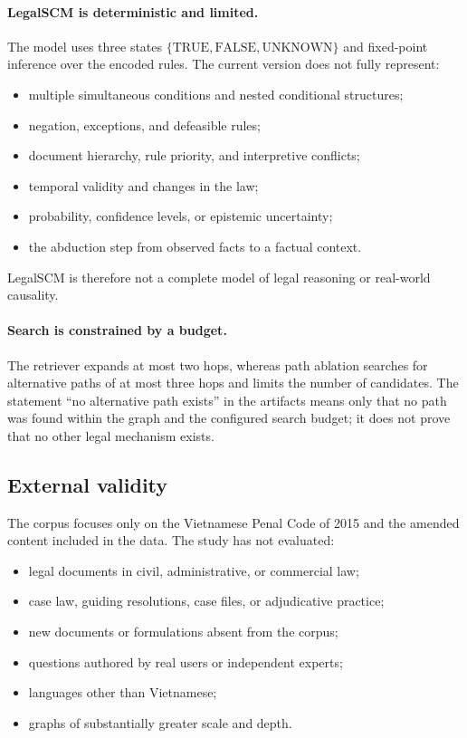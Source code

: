 \paragraph{LegalSCM is deterministic and limited.}

The model uses three states
$\{\mathrm{TRUE},\mathrm{FALSE},\mathrm{UNKNOWN}\}$ and fixed-point
inference over the encoded rules. The current version does not fully
represent:

\begin{itemize}
    \item multiple simultaneous conditions and nested conditional structures;
    \item negation, exceptions, and defeasible rules;
    \item document hierarchy, rule priority, and interpretive conflicts;
    \item temporal validity and changes in the law;
    \item probability, confidence levels, or epistemic uncertainty;
    \item the abduction step from observed facts to a factual context.
\end{itemize}

LegalSCM is therefore not a complete model of legal reasoning or real-world
causality.

\paragraph{Search is constrained by a budget.}

The retriever expands at most two hops, whereas path ablation searches for
alternative paths of at most three hops and limits the number of candidates.
The statement ``no alternative path exists'' in the artifacts means only that
no path was found within the graph and the configured search budget; it does
not prove that no other legal mechanism exists.

\subsection{External validity}

The corpus focuses only on the Vietnamese Penal Code of 2015 and the amended
content included in the data. The study has not evaluated:

\begin{itemize}
    \item legal documents in civil, administrative, or commercial law;
    \item case law, guiding resolutions, case files, or adjudicative practice;
    \item new documents or formulations absent from the corpus;
    \item questions authored by real users or independent experts;
    \item languages other than Vietnamese;
    \item graphs of substantially greater scale and depth.
\end{itemize}

